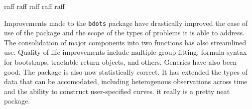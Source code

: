 \documentclass{article}
\begin{document}
raff raff raff raff raff


Improvements made to the \texttt{bdots} package have drastically improved the ease of use of the package and the scope of the types of  problems it is able to address. The consolidation of major components into two functions has also streamlined use. Quality of life improvements include multiple group fitting, formula syntax for bootstraps, tractable return objects, and others. Generics have also been good. The package is also now statistically correct. It has extended the types of data that can be accomodated, including heterogenous observations across time and the ability to construct user-specified curves. it really is a pretty neat package.
\end{document}
